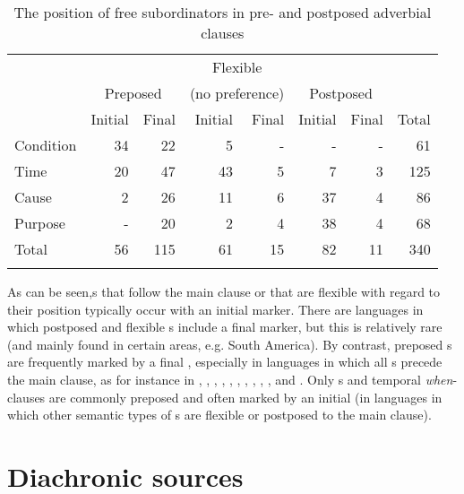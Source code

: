 \documentclass[output=paper]{langsci/langscibook}
\begin{document}
\begin{table}
\begin{tabularx}{\textwidth}{X rr  rr rr  r}
\lsptoprule
& & & \multicolumn{2}{c}{Flexible}\\
& \multicolumn{2}{c}{Preposed} &  \multicolumn{2}{c}{(no preference)} &  \multicolumn{2}{c}{Postposed} \\
\cmidrule(lr){2-3}\cmidrule(lr){4-5}\cmidrule(lr){6-7}
&   Initial &   Final &   Initial &   Final &   Initial &   Final & Total\\
\midrule
{Condition} 	& 34 	& 22 	& 5 	& - 	& - 	& - 	& 61\\
{Time} 		& 20 	& 47 	& 43 	& 5 	& 7 	& 3 	& 125\\
{Cause} 	& 2 	& 26 	& 11 	& 6 	& 37 	& 4 	& 86\\
{Purpose} 	& - 	& 20 	& 2 	& 4 	& 38 	& 4 	& 68\\
\midrule
{Total} 	& 56 	& 115 	& 61 	& 15 	& 82 	& 11 	& 340\\
\lspbottomrule
\end{tabularx}

\caption{The position of free subordinators in pre- and postposed adverbial clauses}
\label{tab:diessel:3}
\end{table}
\largerpage
As can be seen,s that follow the main clause or that are flexible with regard to their position typically occur with an initial marker. There are languages in which postposed and flexible s include a final marker, but this is relatively rare (and mainly found in certain areas, e.g. South America). By contrast, preposed s are frequently marked by a final , especially in languages in which all s precede the main clause, as for instance in , , , , , , , , , , and . Only s and temporal \textit{when}-clauses are commonly preposed and often marked       by an initial  (in languages in which other semantic types of s \largerpage are flexible or postposed to the main clause). 

\section{Diachronic sources}\label{sec:diessel:3}
\end{document}
